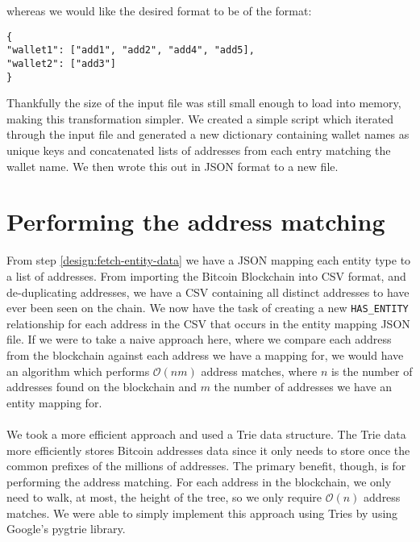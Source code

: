 whereas we would like the desired format to be of the format:

\begin{lstlisting}
{
"wallet1": ["add1", "add2", "add4", "add5],
"wallet2": ["add3"]
}
\end{lstlisting}
Thankfully the size of the input file was still small enough to load into memory, making this transformation simpler. We created a simple script which iterated through the input file and generated a new dictionary containing wallet names as unique keys and concatenated lists of addresses from each entry matching the wallet name. We then wrote this out in JSON format to a new file. 

\section{Performing the address matching}\label{address-matching-trie}
From step \ref{design:fetch-entity-data} we have a JSON mapping each entity type to a list of addresses. From importing the Bitcoin Blockchain into CSV format, and de-duplicating addresses, we have a CSV containing all distinct addresses to have ever been seen on the chain. We now have the task of creating a new \texttt{HAS\_ENTITY} relationship for each address in the CSV that occurs in the entity mapping JSON file. If we were to take a naive approach here, where we compare each address from the blockchain against each address we have a mapping for, we would have an algorithm which performs $\mathcal{O}(nm)$ address matches, where $n$ is the number of addresses found on the blockchain and $m$ the number of addresses we have an entity mapping for. 
\\\\
We took a more efficient approach and used a Trie data structure. The Trie data more efficiently stores Bitcoin addresses data since it only needs to store once the common prefixes of the millions of addresses. The primary benefit, though, is for performing the address matching. For each address in the blockchain, we only need to walk, at most, the height of the tree, so we only require $\mathcal{O}(n)$ address matches. We were able to simply implement this approach using Tries by using Google's pygtrie library. 